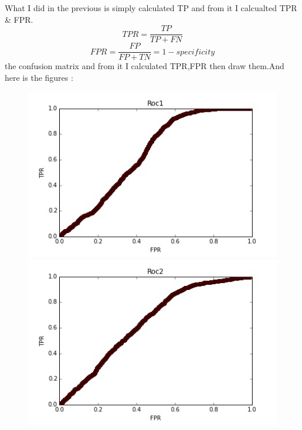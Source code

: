 \documentclass{article}
\begin{document}
What  I did in the previous is simply calculated TP and from it I calcualted TPR \& FPR.
\[TPR = \frac{TP}{TP+FN}\]
\[FPR = \frac{FP}{FP+TN} = 1 - specificity \]
 the confusion matrix and from it I calculated TPR,FPR then draw them.And here is the figures :\\
\begin{figure}[H]
	\includegraphics[scale=0.58]{roc1.jpg}
	\includegraphics[scale=0.58]{roc2.jpg}\\

\end{figure}
\end{document}
